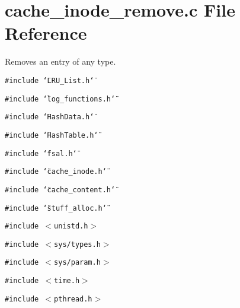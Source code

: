 \section{cache\_\-inode\_\-remove.c File Reference}
\label{cache__inode__remove_8c}
Removes an entry of any type.  


{\tt \#include \char`\"{}LRU\_\-List.h\char`\"{}}\par
{\tt \#include \char`\"{}log\_\-functions.h\char`\"{}}\par
{\tt \#include \char`\"{}HashData.h\char`\"{}}\par
{\tt \#include \char`\"{}HashTable.h\char`\"{}}\par
{\tt \#include \char`\"{}fsal.h\char`\"{}}\par
{\tt \#include \char`\"{}cache\_\-inode.h\char`\"{}}\par
{\tt \#include \char`\"{}cache\_\-content.h\char`\"{}}\par
{\tt \#include \char`\"{}stuff\_\-alloc.h\char`\"{}}\par
{\tt \#include $<$unistd.h$>$}\par
{\tt \#include $<$sys/types.h$>$}\par
{\tt \#include $<$sys/param.h$>$}\par
{\tt \#include $<$time.h$>$}\par
{\tt \#include $<$pthread.h$>$}\par
